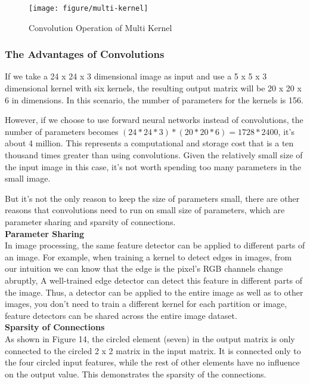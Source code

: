 \documentclass{article}
\begin{document}
\begin{figure}[htbp]
        \centering
        \texttt{[image: figure/multi-kernel]}
        \caption{Convolution Operation of Multi Kernel}
     \end{figure}


\newpage
\subsubsection{The Advantages of Convolutions}
If we take a 24 x 24 x 3 dimensional image as input and use a 5 x 5 x 3 dimensional kernel with six kernels, the resulting output matrix will be 20 x 20 x 6 in dimensions. In this scenario, the number of parameters for the kernels is 156.

However, if we choose to use forward neural networks instead of convolutions, the number of parameters becomes $(24 * 24 * 3) * (20 * 20 * 6) = 1728 * 2400 $, it's about 4 million. This represents a computational and storage cost that is a ten thousand times greater than using convolutions. Given the relatively small size of the input image in this case, it's not worth spending too many parameters in the small image.

But it's not the only reason to keep the size of parameters small, there are other reasons that convolutions need to run on small size of parameters, which are parameter sharing and sparsity of connections.\\


\noindent
\textbf{Parameter Sharing}\\
\noindent
In image processing, the same feature detector can be applied to different parts of an image. For example, when training a kernel to detect edges in images, from our intuition we can know that the edge is the pixel's RGB channels change abruptly, A well-trained edge detector can detect this feature in different parts of the image. Thus, a detector can be applied to the entire image as well as to other images, you don't need to train a different kernel for each partition or image, feature detectors can be shared across the entire image dataset.\\

\noindent
\textbf{Sparsity of Connections}\\
\noindent
As shown in Figure 14, the circled element (seven) in the output matrix is only connected to the circled 2 x 2 matrix in the input matrix. It is connected only to the four circled input features, while the rest of other elements have no influence on the output value. This demonstrates the sparsity of the connections.
\end{document}
